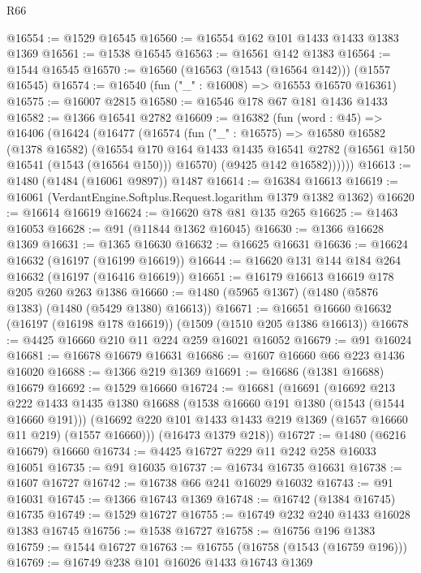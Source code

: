 \begin{lexlean}{R66}
\begin{coremodule}
@16554 := @1529 @16545
@16560 := @16554 @162 @101 @1433 @1433 @1383 @1369
@16561 := @1538 @16545
@16563 := @16561 @142 @1383
@16564 := @1544 @16545
@16570 := @16560 (@16563 (@1543 (@16564 @142))) (@1557 @16545)
@16574 := @16540 (fun ("_" : @16008) => @16553 @16570 @16361)
@16575 := @16007 @2815
@16580 := @16546 @178 @67 @181 @1436 @1433
@16582 := @1366 @16541 @2782
@16609 := @16382
    (fun (word : @45) =>
    @16406
      (@16424
        (@16477
          (@16574
            (fun ("_" : @16575) =>
            @16580
              @16582
              (@1378 @16582)
              (@16554
                @170
                @164
                @1433
                @1435
                @16541
                @2782
                (@16561 @150 @16541 (@1543 (@16564 @150)))
                @16570)
              (@9425 @142 @16582))))))
@16613 := @1480 (@1484 (@16061 @9897)) @1487
@16614 := @16384 @16613
@16619 := @16061 (VerdantEngine.Softplus.Request.logarithm @1379 @1382 @1362)
@16620 := @16614 @16619
@16624 := @16620 @78 @81 @135 @265
@16625 := @1463 @16053
@16628 := @91 (@11844 @1362 @16045)
@16630 := @1366 @16628 @1369
@16631 := @1365 @16630
@16632 := @16625 @16631
@16636 := @16624 @16632 (@16197 (@16199 @16619))
@16644 := @16620 @131 @144 @184 @264 @16632 (@16197 (@16416 @16619))
@16651 := @16179 @16613 @16619 @178 @205 @260 @263 @1386
@16660 := @1480 (@5965 @1367) (@1480 (@5876 @1383) (@1480 (@5429 @1380) @16613))
@16671 := @16651 @16660 @16632 (@16197 (@16198 @178 @16619)) (@1509 (@1510 @205 @1386 @16613))
@16678 := @4425 @16660 @210 @11 @224 @259 @16021 @16052
@16679 := @91 @16024
@16681 := @16678 @16679 @16631
@16686 := @1607 @16660 @66 @223 @1436 @16020
@16688 := @1366 @219 @1369
@16691 := @16686 (@1381 @16688) @16679
@16692 := @1529 @16660
@16724 := @16681
    (@16691
      (@16692
        @213
        @222
        @1433
        @1435
        @1380
        @16688
        (@1538 @16660 @191 @1380 (@1543 (@1544 @16660 @191)))
        (@16692 @220 @101 @1433 @1433 @219 @1369 (@1657 @16660 @11 @219) (@1557 @16660)))
      (@16473 @1379 @218))
@16727 := @1480 (@6216 @16679) @16660
@16734 := @4425 @16727 @229 @11 @242 @258 @16033 @16051
@16735 := @91 @16035
@16737 := @16734 @16735 @16631
@16738 := @1607 @16727
@16742 := @16738 @66 @241 @16029 @16032
@16743 := @91 @16031
@16745 := @1366 @16743 @1369
@16748 := @16742 (@1384 @16745) @16735
@16749 := @1529 @16727
@16755 := @16749 @232 @240 @1433 @16028 @1383 @16745
@16756 := @1538 @16727
@16758 := @16756 @196 @1383
@16759 := @1544 @16727
@16763 := @16755 (@16758 (@1543 (@16759 @196)))
@16769 := @16749 @238 @101 @16026 @1433 @16743 @1369

\end{coremodule}
\end{lexlean}
